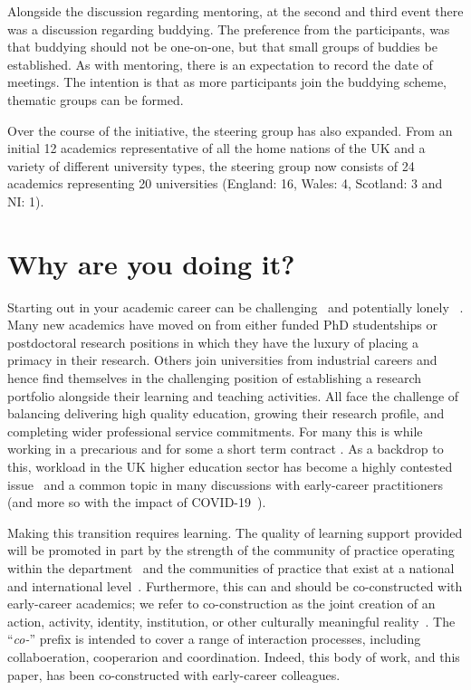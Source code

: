 \documentclass[sigconf]{acmart}
\begin{document}
Alongside the discussion regarding mentoring, at the second and third
event there was a discussion regarding buddying. The preference from
the participants, was that buddying should not be one-on-one, but that
small groups of buddies be established. As with mentoring, there is an
expectation to record the date of meetings. The intention is that as
more participants join the buddying scheme, thematic groups can be
formed.

Over the course of the initiative, the steering group has also
expanded. From an initial 12 academics representative of all the home
nations of the UK and a variety of different university types, the
steering group now consists of 24 academics representing 20
universities (England: 16, Wales: 4, Scotland: 3 and NI: 1).

\section{Why are you doing it?}
\label{sec:Why}
Starting out in your academic career can be
challenging~\cite{Thomas2015} and potentially lonely
~\cite{Foote2009}. Many new academics have moved on from either funded
PhD studentships or postdoctoral research positions in which they have
the luxury of placing a primacy in their research. Others join
universities from industrial careers and hence find themselves in the
challenging position of establishing a research portfolio alongside
their learning and teaching activities. All face the challenge of
balancing delivering high quality education, growing their research
profile, and completing wider professional service commitments. For
many this is while working in a precarious and for some a short term
contract \cite{UCU,JaffeS}. As a backdrop to this, workload in the UK
higher education sector has become a highly contested
issue~\cite{UCU2016} and a common topic in many discussions with
early-career practitioners (and more so with the impact of
COVID-19~\cite{crick-et-al:ukicer2020,watermeyer-et-al:he2020,CrickCovidUK}).

Making this transition requires learning. The quality of learning
support provided will be promoted in part by the strength of the
community of practice operating within the
department~\cite{Bolander2008} and the communities of practice that
exist at a national and international
level~\cite{Thomas2015}. Furthermore, this can and should be
co-constructed with early-career academics; we refer to
co-construction as the joint creation of an action, activity,
identity, institution, or other culturally meaningful
reality~\cite{jacoby+ochs:1995}. The ``{\emph{co-}}'' prefix is
intended to cover a range of interaction processes, including
collaboeration, cooperarion and coordination. Indeed, this body of
work, and this paper, has been co-constructed with early-career
colleagues.
\end{document}
